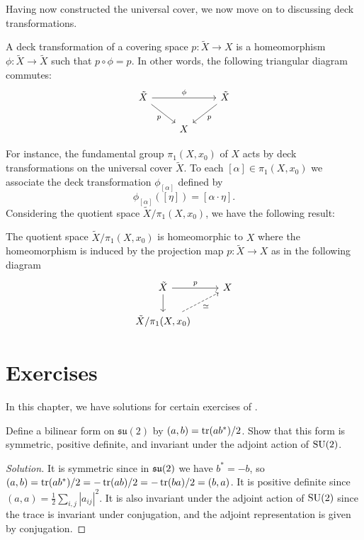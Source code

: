 \documentclass{report}
\begin{document}
Having now constructed the universal cover, we now move on to discussing deck transformations.
\begin{definition}
    A deck transformation of a covering space $p: \tilde X \to X$ is a homeomorphism $\phi: \tilde X \to \tilde X$ such that $p \circ \phi = p$.
    In other words, the following triangular diagram commutes:
    \[
    \begin{tikzcd}
        \tilde X \arrow[rr, "\phi"] \arrow[rd, "p"'] & & \tilde X \arrow[ld, "p"] \\
        & X &
    \end{tikzcd}
    \]
\end{definition}
For instance, the fundamental group $\pi_1(X, x_0)$ of $X$ acts by deck transformations on the universal cover $\tilde X$.
To each $[\alpha] \in \pi_1(X, x_0)$ we associate the deck transformation $\phi_{[\alpha]}$ defined by
\[
\phi_{[\alpha]}([\eta]) = [\alpha \cdot \eta].
\]
Considering the quotient space $\tilde X / \pi_1(X, x_0)$, we have the following result:
\begin{theorem}
    The quotient space $\tilde X / \pi_1(X, x_0)$ is homeomorphic to $X$ where the homeomorphism is induced by the projection map $p: \tilde X \to X$ as in the following diagram
    \[
    \begin{tikzcd}
        \tilde X \arrow[r, "p"] \arrow[d] & X \\
        \tilde X / \pi_1(X, x_0) \arrow[ur, "\simeq"', dashed]
    \end{tikzcd}
    \]
\end{theorem}

\chapter{Exercises}
In this chapter, we have solutions for certain exercises of \cite{kirillov2008introduction}.

\begin{exercise}[Exercise 2.7]
Deﬁne a bilinear form on $\mathfrak{su}(2)$ by $(a, b) = \operatorname{tr}(ab^*)/2$. 
Show that this form is symmetric, positive deﬁnite, and invariant under the adjoint action of
$\operatorname{{\mathrm{SU}}}(2)$.
\end{exercise}
\begin{proof}[Solution]
    It is symmetric since in $\operatorname{{\mathfrak{su}}}(2)$ we have $b^* = -b$, so $(a,b) = \operatorname{tr}(ab^*)/2 = -\operatorname{tr}(ab)/2 = 
    -\operatorname{tr}(ba)/2 = (b,a)$.
    It is positive definite since $(a,a) = \frac{1}{2} \sum_{i,j} |a_{ij}|^2$.
    It is also invariant under the adjoint action of $\operatorname{{\mathrm{SU}}}(2)$ since the trace is invariant under conjugation, and the adjoint representation is given by conjugation.
\end{proof}
\end{document}
